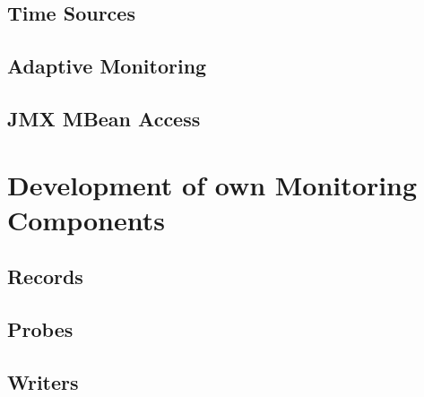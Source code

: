 		\subsection{Time Sources}
		\subsection{Adaptive Monitoring}
		\subsection{JMX MBean Access}
	\section{Development of own Monitoring Components}
		\subsection{Records}
		\subsection{Probes}
		\subsection{Writers}